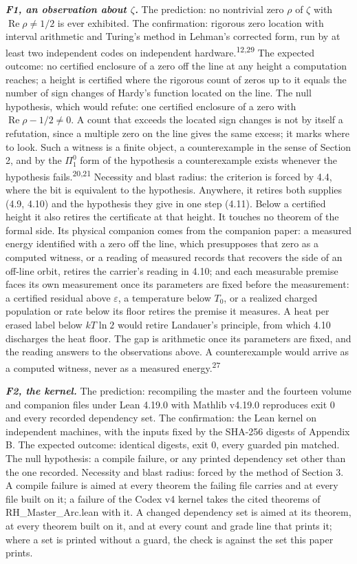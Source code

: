 \documentclass[10pt]{article}
\begin{document}
\textbf{\emph{F1, an observation about \(\zeta\).}} The prediction: no
nontrivial zero \(\rho\) of \(\zeta\) with
\(\operatorname{Re}\rho \ne 1/2\) is ever exhibited. The confirmation:
rigorous zero location with interval arithmetic and Turing's method in
Lehman's corrected form, run by at least two independent codes on
independent hardware.\textsuperscript{12,29} The expected outcome: no
certified enclosure of a zero off the line at any height a computation
reaches; a height is certified where the rigorous count of zeros up to
it equals the number of sign changes of Hardy's function located on the
line. The null hypothesis, which would refute: one certified enclosure
of a zero with \(\operatorname{Re}\rho - 1/2 \ne 0\). A count that
exceeds the located sign changes is not by itself a refutation, since a
multiple zero on the line gives the same excess; it marks where to look.
Such a witness is a finite object, a counterexample in the sense of
Section 2, and by the \(\Pi^0_1\) form of the hypothesis a
counterexample exists whenever the hypothesis
fails.\textsuperscript{20,21} Necessity and blast radius: the criterion
is forced by 4.4, where the bit is equivalent to the hypothesis.
Anywhere, it retires both supplies (4.9, 4.10) and the hypothesis they
give in one step (4.11). Below a certified height it also retires the
certificate at that height. It touches no theorem of the formal side.
Its physical companion comes from the companion paper: a measured energy
identified with a zero off the line, which presupposes that zero as a
computed witness, or a reading of measured records that recovers the
side of an off-line orbit, retires the carrier's reading in 4.10; and
each measurable premise faces its own measurement once its parameters
are fixed before the measurement: a certified residual above
\(\varepsilon\), a temperature below \(T_0\), or a realized charged
population or rate below its floor retires the premise it measures. A
heat per erased label below \(kT \ln 2\) would retire Landauer's
principle, from which 4.10 discharges the heat floor. The gap is
arithmetic once its parameters are fixed, and the reading answers to the
observations above. A counterexample would arrive as a computed witness,
never as a measured energy.\textsuperscript{27}

\textbf{\emph{F2, the kernel.}} The prediction: recompiling the master
and the fourteen volume and companion files under Lean 4.19.0 with
Mathlib v4.19.0 reproduces exit 0 and every recorded dependency set. The
confirmation: the Lean kernel on independent machines, with the inputs
fixed by the SHA-256 digests of Appendix B. The expected outcome:
identical digests, exit 0, every guarded pin matched. The null
hypothesis: a compile failure, or any printed dependency set other than
the one recorded. Necessity and blast radius: forced by the method of
Section 3. A compile failure is aimed at every theorem the failing file
carries and at every file built on it; a failure of the Codex v4 kernel
takes the cited theorems of RH\_Master\_Arc.lean with it. A changed
dependency set is aimed at its theorem, at every theorem built on it,
and at every count and grade line that prints it; where a set is printed
without a guard, the check is against the set this paper prints.
\end{document}
